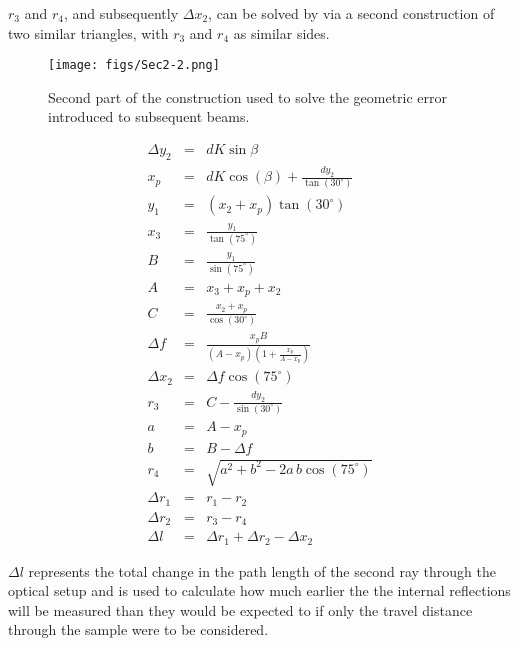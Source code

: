 $r_{3}$ and $r_{4}$, and subsequently $\Delta x_{2}$, can be solved by via a second construction of two similar triangles, with $r_{3}$ and $r_{4}$ as similar sides.

\begin{figure}[H]
\begin{center}
\texttt{[image: figs/Sec2-2.png]}
\end{center}
\caption[Second section of the exiting beam path used to calculate a geometric correction for subsequent beams.]{Second part of the construction used to solve the geometric error introduced to subsequent beams.}\label{fig:GeoSec-2}
\end{figure}

\begin{eqnarray}
\Delta y_{2} &=& dK\sin{\beta}\\
x_{p} &=& dK\cos(\beta) + \frac{dy_{2}}{\tan(30^{\circ})}\\
y_{1} &=& (x_{2} + x_{p})\tan(30^{\circ})\\
x_{3} &=& \frac{y_{1}}{\tan(75^{\circ})}\\
B &=& \frac{y_{1}}{\sin(75^{\circ})}\\
A &=& x_{3} + x_{p} + x_{2}\\
C &=& \frac{x_{2} + x_{p}}{\cos(30^{\circ})}\\
\Delta f &=& \frac{x_{p}B}{(A - x_{p})(1 + \frac{x_{p}}{A - x_{p}})}\\
\Delta x_{2} &=& \Delta f\cos(75^{\circ})\\
r_{3} &=& C - \frac{dy_{2}}{\sin(30^{\circ})}\\
a &=&  A - x_{p}\\
b &=&  B - \Delta f\\
r_{4} &=& \sqrt{a^{2} + b^{2} - 2a\,b\cos(75^{\circ})}\\
\Delta r_{1} &=& r_{1} - r_{2}\\
\Delta r_{2} &=& r_{3} - r_{4}\\
\Delta l &=& \Delta r_{1} + \Delta r_{2} - \Delta x_{2}
\label{eq:eqn:geo2}
\end{eqnarray}

$\Delta l$ represents the total change in the path length of the second ray through the optical setup and is used to calculate how much earlier the the internal reflections will be measured than they would be expected to if only the travel distance through the sample were to be considered.

\endinput